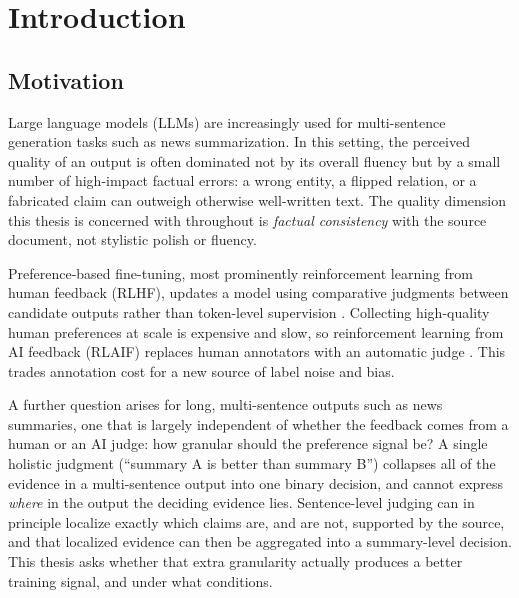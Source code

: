 \chapter{Introduction}
\label{ch:introduction}

\section{Motivation}
\label{sec:intro-motivation}

Large language models (LLMs) are increasingly used for multi-sentence generation
tasks such as news summarization. In this setting, the perceived quality of an output is often
dominated not by its overall fluency but by a small number of high-impact factual
errors: a wrong entity, a flipped relation, or a fabricated claim can outweigh
otherwise well-written text. The quality dimension this thesis is concerned with
throughout is \emph{factual consistency} with the source document, not stylistic
polish or fluency.

Preference-based fine-tuning, most prominently reinforcement learning from human
feedback (RLHF), updates a model using comparative judgments between candidate
outputs rather than token-level supervision \citep{christiano2017deep,
stiennon2020learning, ouyang2022training}. Collecting high-quality human preferences
at scale is expensive and slow, so reinforcement learning from AI feedback (RLAIF)
replaces human annotators with an automatic judge \citep{bai2022constitutional,
lee2023rlaif}. This trades annotation cost for a new source of label noise and bias.

A further question arises for long, multi-sentence outputs such as news summaries,
one that is largely independent of whether the feedback comes from a human or an AI
judge: how granular should the preference signal be? A single holistic judgment
(``summary A is better than summary B'') collapses all of the evidence in a
multi-sentence output into one binary decision, and cannot express \emph{where}
in the output the deciding evidence lies. Sentence-level judging can in
principle localize exactly which claims are, and are not, supported by the source,
and that localized evidence can then be aggregated into a summary-level decision.
This thesis asks whether that extra granularity actually produces a better training
signal, and under what conditions.

